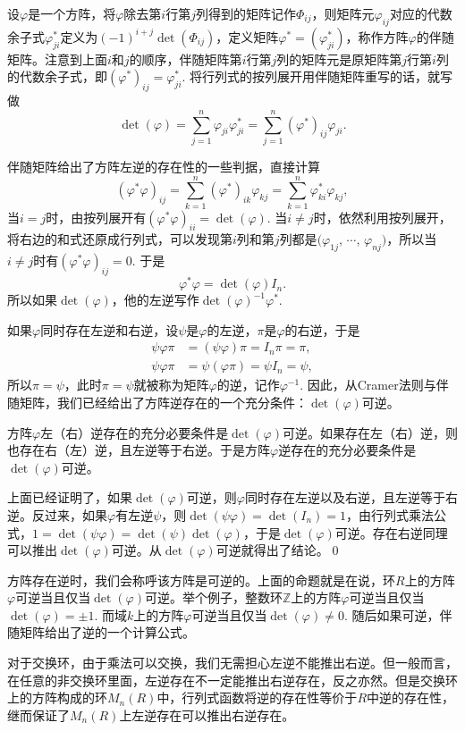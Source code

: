 \para 设$\varphi$是一个方阵，将$\varphi$除去第$i$行第$j$列得到的矩阵记作$\Phi_{ij}$，则矩阵元$\varphi_{ij}$对应的代数余子式$\varphi_{ji}^*$定义为$(-1)^{i+j}\det(\Phi_{ij})$，定义矩阵$\varphi^*=(\varphi_{ji}^*)$，称作方阵$\varphi$的伴随矩阵。注意到上面$i$和$j$的顺序，伴随矩阵第$i$行第$j$列的矩阵元是原矩阵第$j$行第$i$列的代数余子式，即$(\varphi^*)_{ij}=\varphi_{ji}^*$. 将行列式的按列展开用伴随矩阵重写的话，就写做
\[
	\det(\varphi)=\sum_{j=1}^n\varphi_{ji}\varphi_{ji}^*=\sum_{j=1}^n(\varphi^*)_{ij}\varphi_{ji}.
\]

伴随矩阵给出了方阵左逆的存在性的一些判据，直接计算
\[
	(\varphi^*\varphi)_{ij}=\sum_{k=1}^n(\varphi^*)_{ik}\varphi_{kj}=\sum_{k=1}^n\varphi^*_{ki}\varphi_{kj},
\]
当$i=j$时，由按列展开有$(\varphi^*\varphi)_{ii}=\det(\varphi)$. 当$i\neq j$时，依然利用按列展开，将右边的和式还原成行列式，可以发现第$i$列和第$j$列都是$(\varphi_{1j}$, $\cdots$, $\varphi_{nj})$，所以当$i\neq j$时有$(\varphi^*\varphi)_{ij}=0$. 于是
\[
	\varphi^*\varphi=\det(\varphi)I_n.
\]
所以如果$\det(\varphi)$，他的左逆写作$\det(\varphi)^{-1}\varphi^*$.

\para 如果$\varphi$同时存在左逆和右逆，设$\psi$是$\varphi$的左逆，$\pi$是$\varphi$的右逆，于是
\[
\begin{aligned}
	\psi\varphi\pi&=(\psi\varphi)\pi=I_n \pi=\pi,\\
	\psi\varphi\pi&=\psi(\varphi\pi)=\psi I_n=\psi,
\end{aligned}
\]
所以$\pi=\psi$，此时$\pi=\psi$就被称为矩阵$\varphi$的逆，记作$\varphi^{-1}$. 因此，从Cramer法则与伴随矩阵，我们已经给出了方阵逆存在的一个充分条件：$\det(\varphi)$可逆。

\pro 方阵$\varphi$左（右）逆存在的充分必要条件是$\det(\varphi)$可逆。如果存在左（右）逆，则也存在右（左）逆，且左逆等于右逆。于是方阵$\varphi$逆存在的充分必要条件是$\det(\varphi)$可逆。

\proof 上面已经证明了，如果$\det(\varphi)$可逆，则$\varphi$同时存在左逆以及右逆，且左逆等于右逆。反过来，如果$\varphi$有左逆$\psi$，则$\det(\psi\varphi)=\det(I_n)=1$，由行列式乘法公式，$1=\det(\psi\varphi)=\det(\psi)\det(\varphi)$，于是$\det(\varphi)$可逆。存在右逆同理可以推出$\det(\varphi)$可逆。从$\det(\varphi)$可逆就得出了结论。\qed

方阵存在逆时，我们会称呼该方阵是可逆的。上面的命题就是在说，环$R$上的方阵$\varphi$可逆当且仅当$\det(\varphi)$可逆。举个例子，整数环$\mathbb{Z}$上的方阵$\varphi$可逆当且仅当$\det(\varphi)=\pm 1$. 而域$k$上的方阵$\varphi$可逆当且仅当$\det(\varphi)\neq 0$. 随后如果可逆，伴随矩阵给出了逆的一个计算公式。

对于交换环，由于乘法可以交换，我们无需担心左逆不能推出右逆。但一般而言，在任意的非交换环里面，左逆存在不一定能推出右逆存在，反之亦然。但是交换环上的方阵构成的环$M_n(R)$中，行列式函数将逆的存在性等价于$R$中逆的存在性，继而保证了$M_n(R)$上左逆存在可以推出右逆存在。